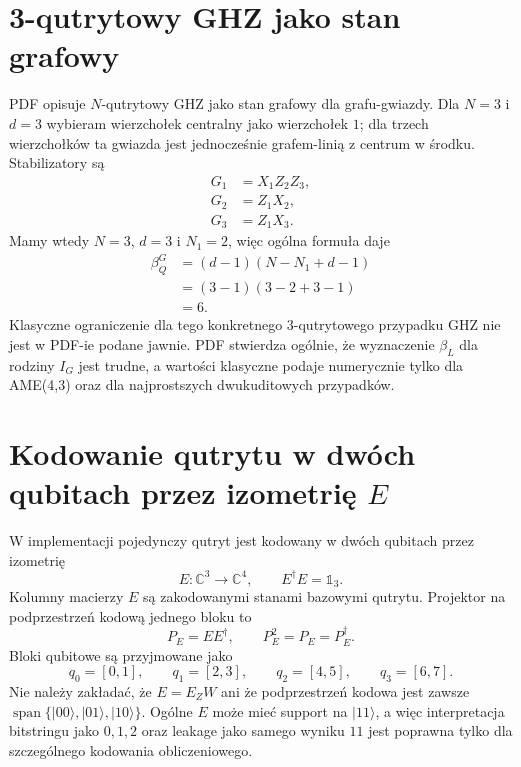 \documentclass[12pt]{article}
\newcommand{\ket}[1]{\lvert #1\rangle}
\newcommand{\id}{\mathbb{1}}
\begin{document}
\section{3-qutrytowy GHZ jako stan grafowy}

PDF opisuje $N$-qutrytowy GHZ jako stan grafowy dla grafu-gwiazdy. Dla $N=3$ i $d=3$
wybieram wierzcho\l{}ek centralny jako wierzcho\l{}ek $1$; dla trzech wierzcho\l{}k\'ow ta gwiazda
jest jednocze\'snie grafem-lini\k{a} z centrum w \'srodku. Stabilizatory s\k{a}
\begin{align}
    G_1 &= X_1Z_2Z_3,\\
    G_2 &= Z_1X_2,\\
    G_3 &= Z_1X_3.
\end{align}
Mamy wtedy $N=3$, $d=3$ i $N_1=2$, wi\k{e}c og\'olna formu\l{}a daje
\begin{align}
    \beta_Q^G
    &=
    (d-1)(N-N_1+d-1)\\
    &=
    (3-1)(3-2+3-1)\\
    &=6.
\end{align}
Klasyczne ograniczenie dla tego konkretnego 3-qutrytowego przypadku GHZ nie jest w PDF-ie
podane jawnie. PDF stwierdza og\'olnie, \.ze wyznaczenie $\beta_L$ dla rodziny $I_G$ jest trudne,
a warto\'sci klasyczne podaje numerycznie tylko dla AME(4,3) oraz dla najprostszych
dwukuditowych przypadk\'ow.

\section{Kodowanie qutrytu w dw\'och qubitach przez izometri\k{e} $E$}

W implementacji pojedynczy qutryt jest kodowany w dw\'och qubitach przez izometri\k{e}
\begin{equation}
    E:\mathbb{C}^3\longrightarrow \mathbb{C}^4,
    \qquad
    E^\dagger E=\id_3.
\end{equation}
Kolumny macierzy $E$ s\k{a} zakodowanymi stanami bazowymi qutrytu. Projektor na
podprzestrze\'n kodow\k{a} jednego bloku to
\begin{equation}
    P_E=EE^\dagger,
    \qquad
    P_E^2=P_E=P_E^\dagger.
\end{equation}
Bloki qubitowe s\k{a} przyjmowane jako
\begin{equation}
    q_0=[0,1],\qquad q_1=[2,3],\qquad q_2=[4,5],\qquad q_3=[6,7].
\end{equation}
Nie nale\.zy zak\l{}ada\'c, \.ze $E=E_ZW$ ani \.ze podprzestrze\'n kodowa jest zawsze
$\operatorname{span}\{\ket{00},\ket{01},\ket{10}\}$. Og\'olne $E$ mo\.ze mie\'c support na
$\ket{11}$, a wi\k{e}c interpretacja bitstringu jako $0,1,2$ oraz leakage jako samego wyniku
$11$ jest poprawna tylko dla szczeg\'olnego kodowania obliczeniowego.
\end{document}
